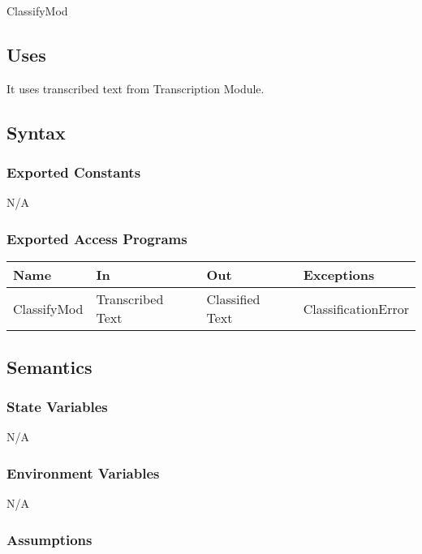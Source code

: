 \documentclass[12pt, titlepage]{article}
\begin{document}
ClassifyMod

\subsection{Uses}

It uses transcribed text from Transcription Module.

\subsection{Syntax}

\subsubsection{Exported Constants}

N/A

\subsubsection{Exported Access Programs}

\begin{center}
  \begin{tabular}{p{2.5cm} p{4cm} p{4cm} p{3cm}}  %
  \hline
  \textbf{Name} & \textbf{In} & \textbf{Out} & \textbf{Exceptions} \\
  \hline
  ClassifyMod & Transcribed Text & Classified Text & ClassificationError \\ 
  \hline
  \end{tabular}
  \end{center}

\subsection{Semantics}

\subsubsection{State Variables}

N/A

\subsubsection{Environment Variables}

N/A

\subsubsection{Assumptions}
\end{document}
